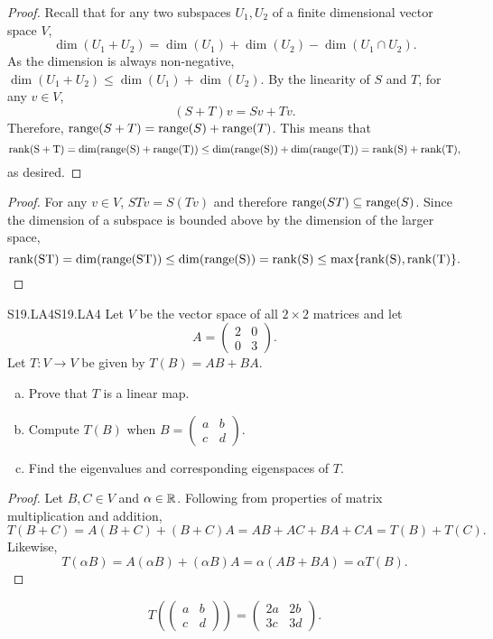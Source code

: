 \documentclass[../AlgebraQualSolutions.tex]{subfiles}
\begin{document}
	\begin{proof}
		Recall that for any two subspaces $U_1,U_2$ of a finite dimensional vector space $V$,
			\[\dim(U_1 + U_2) = \dim(U_1) + \dim(U_2) - \dim(U_1 \cap U_2).\]
		As the dimension is always non-negative, $\dim(U_1 + U_2) \leq \dim(U_1) + \dim(U_2)$. By the linearity of $S$ and $T$, for any $v \in V$,
			\[(S + T)v = Sv + Tv.\]
		Therefore, $\mathrm{range}(S + T) = \mathrm{range}(S) + \mathrm{range}(T)$. This means that
			\[\rm{rank}(S+T) = \dim(\mathrm{range}(S) + \mathrm{range}(T)) \leq \dim(\mathrm{range}(S)) + \dim(\mathrm{range}(T)) = \rm{rank}(S) + \rm{rank}(T),\]
		as desired.
	\end{proof}

	\begin{proof}
		For any $v \in V$, $STv = S(Tv)$ and therefore $\mathrm{range}(ST) \subseteq \mathrm{range}(S)$. Since the dimension of a subspace is bounded above by the dimension of the larger space,
			\[\rm{rank}(ST) = \dim(\mathrm{range}(ST)) \leq \dim(\mathrm{range}(S)) = \rm{rank}(S) \leq \max\{\rm{rank}(S),\rm{rank}(T)\}.\]
	\end{proof}

	\begin{prob}{S19.LA4}{S19.LA4}
		Let $V$ be the vector space of all $2 \times 2$ matrices and let 
			\[A = \begin{pmatrix} 2 & 0\\ 0 & 3 \end{pmatrix}. \]
		Let $T: V \to V$ be given by $T(B) = AB + BA$.

		\begin{enumerate}[(a)]
			\item Prove that $T$ is a linear map.
			\item Compute $T(B)$ when $B = \begin{pmatrix} a & b \\ c & d \end{pmatrix}$.
			\item Find the eigenvalues and corresponding eigenspaces of $T$.
		\end{enumerate}
	\end{prob}

	\begin{proof}
		Let $B,C \in V$ and $\alpha \in \mathbb{R}$. Following from properties of matrix multiplication and addition,
			\[T(B + C) = A(B+C) + (B+C)A = AB + AC + BA + CA = T(B) + T(C).\]
		Likewise,
			\[T(\alpha B) = A(\alpha B) + (\alpha B)A = \alpha(AB +BA) = \alpha T(B).\]
	\end{proof}

	\begin{solution}
		\[T\left(\begin{pmatrix} a & b \\ c & d \end{pmatrix}\right) = \begin{pmatrix} 2a & 2b \\ 3c & 3d \end{pmatrix}.\]
	\end{solution}
\end{document}
